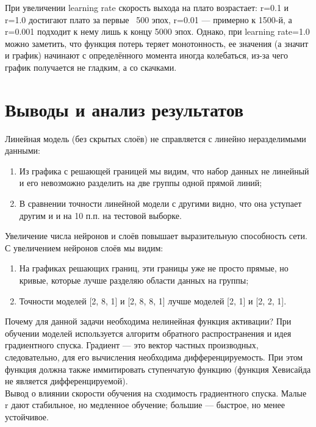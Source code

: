 \documentclass[12pt,a4paper]{article}
\begin{document}
При увеличении learning rate скорость выхода на плато возрастает: r=0.1 и r=1.0 достигают плато за первые ~500 эпох, r=0.01 — примерно к 1500-й, а r=0.001 подходит к нему лишь к концу 5000 эпох. Однако, при learning rate=1.0 можно заметить, что функция потерь теряет монотонность, ее значения (а значит и график) начинают с определённого момента иногда колебаться, из-за чего график получается не гладким, а со скачками.

\section{Выводы и анализ результатов}

Линейная модель (без скрытых слоёв) не справляется с линейно неразделимыми данными:
\begin{enumerate}
    \item Из графика с решающей границей мы видим, что набор данных не линейный и его невозможно разделить на две группы одной прямой линий;
    \item В сравнении точности линейной модели с другими видно, что она уступает другим и и на 10 п.п. на тестовой выборке.
\end{enumerate}


Увеличение числа нейронов и слоёв повышает выразительную способность сети. С увеличением нейронов слоёв мы видим:
\begin{enumerate}
    \item На графиках решающих границ, эти границы уже не просто прямые, но кривые, которые лучше разделяю области данных на группы;
    \item Точности моделей [2, 8, 1] и [2, 8, 8, 1] лучше моделей [2, 1] и [2, 2, 1].
\end{enumerate}


Почему для данной задачи необходима нелинейная функция активации? При обучении моделей используется алгоритм обратного распространения и идея градиентного спуска. Градиент — это вектор частных производных, следовательно, для его вычисления необходима дифференцируемость. При этом функция должна также иммитировать ступенчатую функцию (функция Хевисайда не является дифференцируемой).
\\

Вывод о влиянии скорости обучения на сходимость градиентного спуска. Малые r дают стабильное, но медленное обучение; большие — быстрое, но менее устойчивое.
\end{document}
